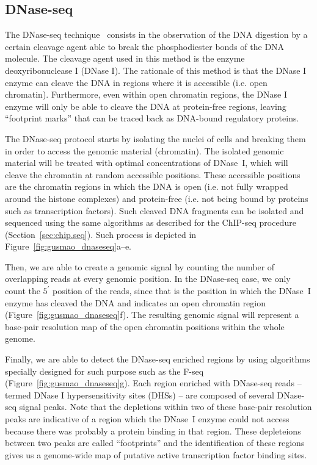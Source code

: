 \subsection{DNase-seq}
\label{sec:dnase.seq}

The DNase-seq technique~\cite{crawford2004,sabo2004a} consists in the observation of the DNA digestion by a certain cleavage agent able to break the phosphodiester bonds of the DNA molecule. The cleavage agent used in this method is the enzyme deoxyribonuclease I (DNase I). The rationale of this method is that the DNase I enzyme can cleave the DNA in regions where it is accessible (i.e. open chromatin). Furthermore, even within open chromatin regions, the DNase I enzyme will only be able to cleave the DNA at protein-free regions, leaving ``footprint marks'' that can be traced back as DNA-bound regulatory proteins.

The DNase-seq protocol starts by isolating the nuclei of cells and breaking them in order to access the genomic material (chromatin). The isolated genomic material will be treated with optimal concentrations of DNase~I, which will cleave the chromatin at random accessible positions. These accessible positions are the chromatin regions in which the DNA is open (i.e. not fully wrapped around the histone complexes) and protein-free (i.e. not being bound by proteins such as transcription factors). Such cleaved DNA fragments can be isolated and sequenced using the same algorithms as described for the ChIP-seq procedure (Section~\ref{sec:chip.seq}). Such process is depicted in Figure~\ref{fig:gusmao_dnaseseq}a--e.

Then, we are able to create a genomic signal by counting the number of overlapping reads at every genomic position. In the DNase-seq case, we only count the $5^{\prime}$ position of the reads, since that is the position in which the DNase~I enzyme has cleaved the DNA and indicates an open chromatin region (Figure~\ref{fig:gusmao_dnaseseq}f). The resulting genomic signal will represent a base-pair resolution map of the open chromatin positions within the whole genome.

Finally, we are able to detect the DNase-seq enriched regions by using algorithms specially designed for such purpose such as the F-seq~\cite{boyle2008b} (Figure~\ref{fig:gusmao_dnaseseq}g). Each region enriched with DNase-seq reads -- termed DNase I hypersensitivity sites (DHSs) -- are composed of several DNase-seq signal peaks. Note that the depletions within two of these base-pair resolution peaks are indicative of a region which the DNase~I enzyme could not access because there was probably a protein binding in that region. These depleteions between two peaks are called ``footprints'' and the identification of these regions gives us a genome-wide map of putative active transcription factor binding sites.

